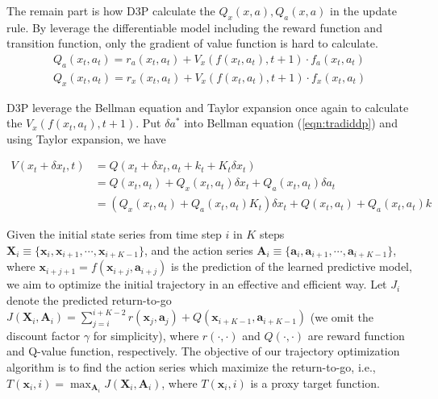 \documentclass{article} %
\begin{document}
The remain part is how D3P    calculate the $Q_x(x,a), Q_a(x,a)$ in the update rule. By leverage the differentiable model including the reward function and transition function, only the gradient of value function is hard to calculate. 
\begin{align}
    Q_a(x_t,a_t) = r_a(x_t,a_t) + V_x(f(x_t,a_t), t+1) \cdot f_a(x_t, a_t) \\
    Q_x(x_t,a_t) = r_x(x_t,a_t) + V_x(f(x_t,a_t), t+1) \cdot f_x(x_t, a_t)
\end{align}

D3P  leverage the Bellman equation and Taylor expansion once again to calculate the $V_x(f(x_t, a_t),t+1)$. Put $\delta a^*$ into Bellman equation (\ref{eqn:tradiddp}) and using  Taylor expansion, we have 


\begin{align}
  V(x_t +\delta x_t , t)   &= Q(x_t + \delta x_t , a_t + k_t + K_t \delta x_t) \\
                            &= Q(x_t, a_t) +  Q_x(x_t, a_t)\delta x_t + Q_a(x_t, a_t) \delta a_t \\
                            &= (Q_x(x_t, a_t) + Q_a(x_t, a_t)K_t) \delta x_t + Q(x_t, a_t) + Q_a(x_t,a_t)k
\end{align}


Given the initial state series from time step $i$ in $K$ steps $\mathbf{X}_i \equiv \{ \mathbf{x}_i, \mathbf{x}_{i+1},\cdots,\mathbf{x}_{i+K-1} \}$, and the action series $\mathbf{A}_i \equiv \{ \mathbf{a}_i, \mathbf{a}_{i+1}, \cdots, \mathbf{a}_{i+K-1} \}$, where $\mathbf{x}_{i+j+1}=f(\mathbf{x}_{i+j} ,\mathbf{a}_{i+j})$ is the prediction of the learned predictive model, we aim to optimize the initial trajectory in an effective and efficient way. Let $J_i$ denote the predicted return-to-go  $J(\mathbf{X}_i, \mathbf{A}_i)=\sum_{j=i}^{i+K-2}r(\mathbf{x}_j, \mathbf{a}_j)+Q(\mathbf{x}_{i+K-1}, \mathbf{a}_{i+K-1})$ (we omit the discount factor $\gamma$ for simplicity), where $r(\cdot, \cdot)$ and $Q(\cdot,\cdot)$ are reward function and Q-value function, respectively. The objective of our trajectory optimization algorithm is to find the action series which  maximize the return-to-go, i.e., $T(\mathbf{x}_i, i)=\max_{\mathbf{A}_i}J(\mathbf{X}_i, \mathbf{A}_i)$, where $T(\mathbf{x}_i, i)$ is a proxy target function.
\end{document}

